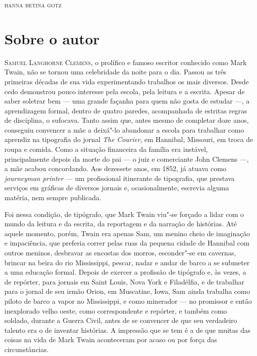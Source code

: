 \begin{flushright}
\textsc{hanna betina gotz}
\end{flushright}
\medskip

\section{Sobre o autor}

\noindent\textsc{Samuel Langhorne Clemens,} o prolífico e famoso escritor conhecido como Mark
Twain, não se tornou uma celebridade da noite para o dia. Passou as três
primeiras décadas de sua vida experimentando trabalhos os mais diversos.
Desde cedo demonstrou pouco interesse pela escola,
pela leitura e a escrita. Apesar de saber soletrar bem --- uma grande
façanha para quem não gosta de estudar ---, a aprendizagem formal, dentro de
quatro paredes, acompanhada de estritas regras de disciplina, o sufocava. Tanto assim que, antes mesmo de
completar doze anos, conseguiu convencer a mãe a deixá"-lo abandonar 
a escola para trabalhar como aprendiz na tipografia do jornal \textit{The Courier},
em Hannibal, Missouri, em troca de roupa e comida. Como a situação
financeira da família era instável, principalmente depois da morte do pai
--- o juiz e comerciante John Clemens ---, a mãe acabou concordando. Aos dezessete
anos, em 1852, já atuava como \textit{journeyman printer} --- um
profissional itinerante de tipografia, que prestava serviços em gráficas
de diversos jornais e, ocasionalmente, escrevia alguma matéria, nem
sempre publicada.

Foi nessa condição, de tipógrafo, que Mark Twain
viu"-se forçado a lidar com o mundo da leitura e da escrita, da reportagem
e da narração de histórias. Até aquele momento, porém, Twain era
apenas Sam, um menino cheio de imaginação e impaciência, que preferia
correr pelas ruas da pequena cidade de Hannibal com outros meninos,
desbravar as encostas dos morros, esconder"-se em cavernas, brincar na
beira do rio Mississippi, pescar, nadar e andar de barco a se submeter a
uma educação formal. Depois de exercer a profissão de tipógrafo e, às
vezes, a de repórter, para jornais em Saint Louis, Nova York e
Filadélfia, e de trabalhar para o jornal de seu irmão Orion, em
Muscatine, Iowa, Sam ainda trabalha como piloto de barco a vapor no
Mississippi, e como minerador --- no promissor e então inexplorado velho oeste,
como correspondente e repórter, e também como soldado, durante a Guerra
Civil, antes de se convencer de que seu verdadeiro talento era o de inventar
histórias. A impressão que se tem é a de que muitas das coisas na vida de
Mark Twain aconteceram por acaso ou por força das circunstâncias.

